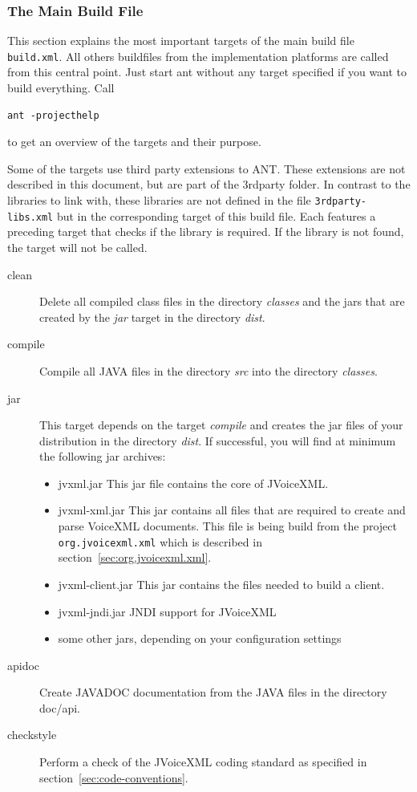 \documentclass[11pt,a4paper]{article}
\begin{document}
\subsubsection{The Main Build File}
\label{sec:ant-build-file}

This section explains the most important targets of the main build file
\texttt{build.xml}. All others buildfiles from the implementation platforms
are called from this central point. Just start ant without any target specified
if you want to build everything. Call
\begin{lstlisting}
ant -projecthelp
\end{lstlisting}
to get an overview of the targets and their purpose.

Some of the targets use third party extensions to ANT. These 
extensions are not described in this document, but are part of
the 3rdparty folder. In contrast to the libraries to link with,
these libraries are not defined in the file \texttt{3rdparty-libs.xml}
but in the corresponding target of this build file. Each features
a preceding target that checks if the library is required. If
the library is not found, the target will not be called.

\begin{description}
\item[clean]
Delete all compiled class files in the directory \emph{classes}
and the jars that are created by the \emph{jar} target in the directory 
\emph{dist}.

\item[compile]
 Compile all JAVA files in the directory \emph{src} into the directory
\emph{classes}.

\item[jar]
 This target depends on the target \emph{compile} and creates the jar
files of your distribution in the directory \emph{dist}.
If successful, you will find at minimum the following jar archives:
\begin{itemize}
\item jvxml.jar This jar file contains the core of JVoiceXML.
\item jvxml-xml.jar This jar contains all files that are required
to create and parse VoiceXML documents. This file is being build from the
project \texttt{org.jvoicexml.xml} which is described in
section~\ref{sec:org.jvoicexml.xml}.
\item jvxml-client.jar This jar contains the files needed to build
a client.
\item jvxml-jndi.jar JNDI support for JVoiceXML
\item some other jars, depending on your configuration settings
\end{itemize}

\item[apidoc]
Create JAVADOC documentation from the JAVA files in the directory
doc/api.
\item[checkstyle]
Perform a check of the JVoiceXML coding standard as specified 
in section~\ref{sec:code-conventions}.
\end{description}
\end{document}
